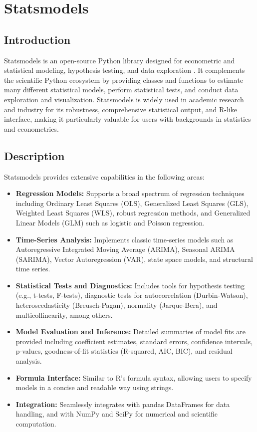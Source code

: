 \section{Statsmodels}

\subsection{Introduction}
Statsmodels is an open-source Python library designed for econometric and statistical modeling, hypothesis testing, and data exploration \cite{seabold2010statsmodels}. It complements the scientific Python ecosystem by providing classes and functions to estimate many different statistical models, perform statistical tests, and conduct data exploration and visualization. Statsmodels is widely used in academic research and industry for its robustness, comprehensive statistical output, and R-like interface, making it particularly valuable for users with backgrounds in statistics and econometrics.

\subsection{Description}
Statsmodels provides extensive capabilities in the following areas:

\begin{itemize}
	\item \textbf{Regression Models:} Supports a broad spectrum of regression techniques including Ordinary Least Squares (OLS), Generalized Least Squares (GLS), Weighted Least Squares (WLS), robust regression methods, and Generalized Linear Models (GLM) such as logistic and Poisson regression.
	\item \textbf{Time-Series Analysis:} Implements classic time-series models such as Autoregressive Integrated Moving Average (ARIMA), Seasonal ARIMA (SARIMA), Vector Autoregression (VAR), state space models, and structural time series.
	\item \textbf{Statistical Tests and Diagnostics:} Includes tools for hypothesis testing (e.g., t-tests, F-tests), diagnostic tests for autocorrelation (Durbin-Watson), heteroscedasticity (Breusch-Pagan), normality (Jarque-Bera), and multicollinearity, among others.
	\item \textbf{Model Evaluation and Inference:} Detailed summaries of model fits are provided including coefficient estimates, standard errors, confidence intervals, p-values, goodness-of-fit statistics (R-squared, AIC, BIC), and residual analysis.
	\item \textbf{Formula Interface:} Similar to R’s formula syntax, allowing users to specify models in a concise and readable way using strings.
	\item \textbf{Integration:} Seamlessly integrates with pandas DataFrames for data handling, and with NumPy and SciPy for numerical and scientific computation.
\end{itemize}

